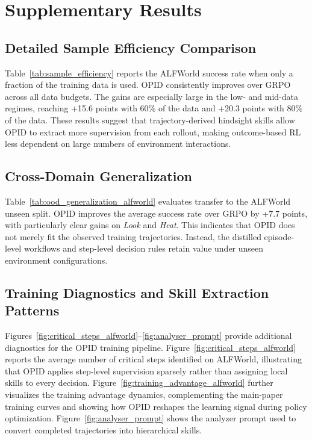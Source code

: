 \section{Supplementary Results}\label{app:supp_results}

\subsection{Detailed Sample Efficiency Comparison}
\label{app:sample_efficiency}
Table~\ref{tab:sample_efficiency} reports the ALFWorld success rate when only a fraction of the training data is used. OPID consistently improves over GRPO across all data budgets. The gains are especially large in the low- and mid-data regimes, reaching +15.6 points with 60\% of the data and +20.3 points with 80\% of the data. These results suggest that trajectory-derived hindsight skills allow OPID to extract more supervision from each rollout, making outcome-based RL less dependent on large numbers of environment interactions.



\subsection{Cross-Domain Generalization}
\label{app:ood_generalization}
Table~\ref{tab:ood_generalization_alfworld} evaluates transfer to the ALFWorld unseen split. OPID improves the average success rate over GRPO by +7.7 points, with particularly clear gains on \textit{Look} and \textit{Heat}. This indicates that OPID does not merely fit the observed training trajectories. Instead, the distilled episode-level workflows and step-level decision rules retain value under unseen environment configurations.



\subsection{Training Diagnostics and Skill Extraction Patterns}
\label{app:training_diagnostics}
Figures~\ref{fig:critical_steps_alfworld}--\ref{fig:analyser_prompt} provide additional diagnostics for the OPID training pipeline. Figure~\ref{fig:critical_steps_alfworld} reports the average number of critical steps identified on ALFWorld, illustrating that OPID applies step-level supervision sparsely rather than assigning local skills to every decision. Figure~\ref{fig:training_advantage_alfworld} further visualizes the training advantage dynamics, complementing the main-paper training curves and showing how OPID reshapes the learning signal during policy optimization. Figure~\ref{fig:analyser_prompt} shows the analyzer prompt used to convert completed trajectories into hierarchical skills.

